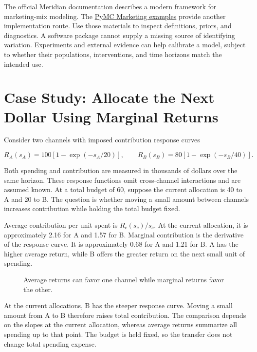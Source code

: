The official
\href{https://developers.google.com/meridian/docs/basics/meridian-introduction}{Meridian
documentation} describes a modern framework for marketing-mix modeling.
The
\href{https://www.pymc-marketing.io/en/latest/notebooks/mmm/mmm_example.html}{PyMC
Marketing examples} provide another implementation route. Use those
materials to inspect definitions, priors, and diagnostics. A software
package cannot supply a missing source of identifying variation.
Experiments and external evidence can help calibrate a model, subject to
whether their populations, interventions, and time horizons match the
intended use.

\hypertarget{M08-case-study-allocate-the-next-dollar-using-marginal-returns}{%
\section{Case Study: Allocate the Next Dollar Using Marginal
Returns}\label{M08-case-study-allocate-the-next-dollar-using-marginal-returns}}

\noindent Consider two channels with imposed contribution response curves

\[
R_A(s_A)=100[1-\exp(-s_A/20)],\qquad
R_B(s_B)=80[1-\exp(-s_B/40)].
\]

Both spending and contribution are measured in thousands of dollars over
the same horizon. These response functions omit cross-channel
interactions and are assumed known. At a total budget of 60, suppose the
current allocation is 40 to A and 20 to B. The question is whether
moving a small amount between channels increases contribution while
holding the total budget fixed.

Average contribution per unit spent is \(R_c(s_c)/s_c\). At the current
allocation, it is approximately 2.16 for A and 1.57 for B. Marginal
contribution is the derivative of the response curve. It is
approximately 0.68 for A and 1.21 for B. A has the higher average
return, while B offers the greater return on the next small unit of
spending.

\begin{figure}[htbp]
\centering

\caption{Average returns can favor one channel while marginal returns favor the other.}\label{fig:M08_marginal_returns}
\end{figure}

At the current allocations, B has the steeper response curve. Moving a
small amount from A to B therefore raises total contribution. The
comparison depends on the slopes at the current allocation, whereas
average returns summarize all spending up to that point. The budget is
held fixed, so the transfer does not change total spending expense.

